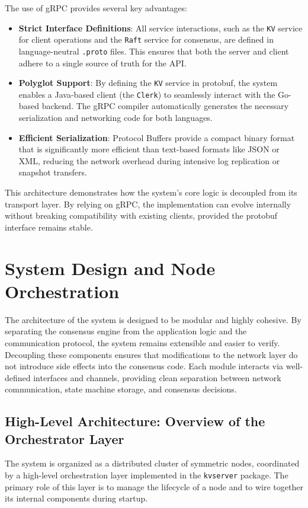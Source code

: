 The use of gRPC provides several key advantages:
\begin{itemize}
    \item \textbf{Strict Interface Definitions}: All service interactions, such as the \texttt{KV} service for client operations and the \texttt{Raft} service for consensus, are defined in language-neutral \texttt{.proto} files. This ensures that both the server and client adhere to a single source of truth for the API.
    \item \textbf{Polyglot Support}: By defining the \texttt{KV} service in protobuf, the system enables a Java-based client (the \texttt{Clerk}) to seamlessly interact with the Go-based backend. The gRPC compiler automatically generates the necessary serialization and networking code for both languages.
    \item \textbf{Efficient Serialization}: Protocol Buffers provide a compact binary format that is significantly more efficient than text-based formats like JSON or XML, reducing the network overhead during intensive log replication or snapshot transfers.
\end{itemize}

This architecture demonstrates how the system's core logic is decoupled from its transport layer.
By relying on gRPC, the implementation can evolve internally without breaking compatibility with existing clients, provided the protobuf interface remains stable.

\section{System Design and Node Orchestration}
The architecture of the system is designed to be modular and highly cohesive. By separating the consensus engine from the application logic and the communication protocol, the system remains extensible and easier to verify.
Decoupling these components ensures that modifications to the network layer do not introduce side effects into the consensus code. Each module interacts via well-defined interfaces and channels, providing clean separation between network communication, state machine storage, and consensus decisions.

\subsection{High-Level Architecture: Overview of the Orchestrator Layer}
The system is organized as a distributed cluster of symmetric nodes, coordinated by a high-level orchestration layer implemented in the \texttt{kvserver} package. The primary role of this layer is to manage the lifecycle of a node and to wire together its internal components during startup.

